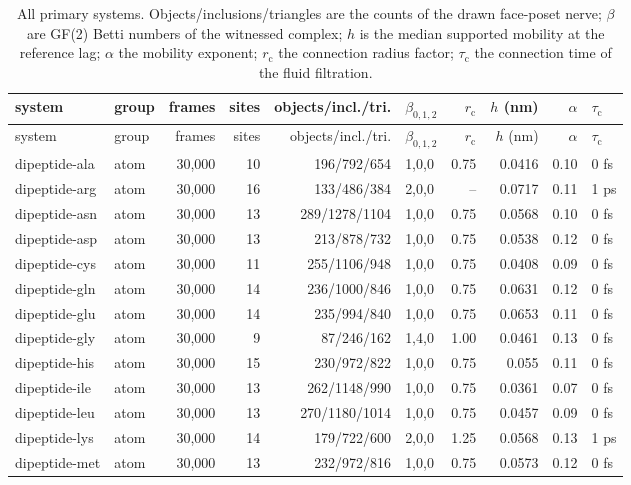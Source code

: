 \begin{small}\begin{longtable}{llrrrlrrrl}
\caption{All primary systems. Objects/inclusions/triangles are the counts of the drawn face-poset nerve; $\beta$ are GF(2) Betti numbers of the witnessed complex; $h$ is the median supported mobility at the reference lag; $\alpha$ the mobility exponent; $r_{\mathrm c}$ the connection radius factor; $\tau_{\mathrm c}$ the connection time of the fluid filtration.}\label{tab:systems}\\
\toprule system & group & frames & sites & objects/incl./tri. & $\beta_{0,1,2}$ & $r_{\mathrm c}$ & $h$ (nm) & $\alpha$ & $\tau_{\mathrm c}$\\\midrule\endfirsthead
\toprule system & group & frames & sites & objects/incl./tri. & $\beta_{0,1,2}$ & $r_{\mathrm c}$ & $h$ (nm) & $\alpha$ & $\tau_{\mathrm c}$\\\midrule\endhead
dipeptide-ala & atom & 30,000 & 10 & 196/792/654 & 1,0,0 & 0.75 & 0.0416 & 0.10 & 0 fs\\
dipeptide-arg & atom & 30,000 & 16 & 133/486/384 & 2,0,0 & -- & 0.0717 & 0.11 & 1 ps\\
dipeptide-asn & atom & 30,000 & 13 & 289/1278/1104 & 1,0,0 & 0.75 & 0.0568 & 0.10 & 0 fs\\
dipeptide-asp & atom & 30,000 & 13 & 213/878/732 & 1,0,0 & 0.75 & 0.0538 & 0.12 & 0 fs\\
dipeptide-cys & atom & 30,000 & 11 & 255/1106/948 & 1,0,0 & 0.75 & 0.0408 & 0.09 & 0 fs\\
dipeptide-gln & atom & 30,000 & 14 & 236/1000/846 & 1,0,0 & 0.75 & 0.0631 & 0.12 & 0 fs\\
dipeptide-glu & atom & 30,000 & 14 & 235/994/840 & 1,0,0 & 0.75 & 0.0653 & 0.11 & 0 fs\\
dipeptide-gly & atom & 30,000 & 9 & 87/246/162 & 1,4,0 & 1.00 & 0.0461 & 0.13 & 0 fs\\
dipeptide-his & atom & 30,000 & 15 & 230/972/822 & 1,0,0 & 0.75 & 0.055 & 0.11 & 0 fs\\
dipeptide-ile & atom & 30,000 & 13 & 262/1148/990 & 1,0,0 & 0.75 & 0.0361 & 0.07 & 0 fs\\
dipeptide-leu & atom & 30,000 & 13 & 270/1180/1014 & 1,0,0 & 0.75 & 0.0457 & 0.09 & 0 fs\\
dipeptide-lys & atom & 30,000 & 14 & 179/722/600 & 2,0,0 & 1.25 & 0.0568 & 0.13 & 1 ps\\
dipeptide-met & atom & 30,000 & 13 & 232/972/816 & 1,0,0 & 0.75 & 0.0573 & 0.12 & 0 fs\\

\end{longtable}
\end{small}

